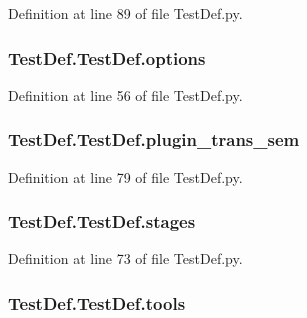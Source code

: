 Definition at line 89 of file Test\-Def.\-py.

\hypertarget{class_test_def_1_1_test_def_a7c7d587995154a9f31607dc4726d3a2a}{
\subsubsection[{options}]{\setlength{\rightskip}{0pt plus 5cm}Test\-Def.\-Test\-Def.\-options}}\label{class_test_def_1_1_test_def_a7c7d587995154a9f31607dc4726d3a2a}


Definition at line 56 of file Test\-Def.\-py.

\hypertarget{class_test_def_1_1_test_def_ac4a745e8b2151d1eed56e04770562eb9}{
\subsubsection[{plugin\-\_\-trans\-\_\-sem}]{\setlength{\rightskip}{0pt plus 5cm}Test\-Def.\-Test\-Def.\-plugin\-\_\-trans\-\_\-sem}}\label{class_test_def_1_1_test_def_ac4a745e8b2151d1eed56e04770562eb9}


Definition at line 79 of file Test\-Def.\-py.

\hypertarget{class_test_def_1_1_test_def_a9e15c13bd0cc9b1567c94f847118432e}{
\subsubsection[{stages}]{\setlength{\rightskip}{0pt plus 5cm}Test\-Def.\-Test\-Def.\-stages}}\label{class_test_def_1_1_test_def_a9e15c13bd0cc9b1567c94f847118432e}


Definition at line 73 of file Test\-Def.\-py.

\hypertarget{class_test_def_1_1_test_def_a2414cc1583555b0c758e0f9f0952a787}{
\subsubsection[{tools}]{\setlength{\rightskip}{0pt plus 5cm}Test\-Def.\-Test\-Def.\-tools}}\label{class_test_def_1_1_test_def_a2414cc1583555b0c758e0f9f0952a787}


